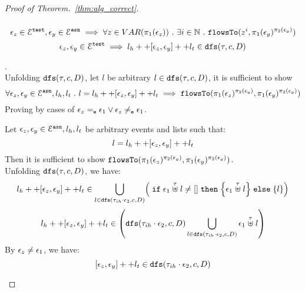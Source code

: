 \begin{proof}[Proof of Theorem.~\ref{thm:alg_correct}]
\begin{case}
\begin{equation}
\end{equation}
%
\begin{equation}
  \mathtt{\epsilon}_z \in \mathcal{E}^{\mathtt{{test}}}, \mathtt{\epsilon}_y \in \mathcal{E}^{\mathtt{{asn}}}
  \implies \forall z \in VAR(\pi_1(\mathtt{\epsilon}_z)) ~.~ \exists i \in\mathbb{N} ~.~
  \mathtt{flowsTo}(z^i, \pi_1(\mathtt{\epsilon}_y)^{\pi_2(\mathtt{\epsilon}_y)})
\end{equation}
%
\begin{equation}
  \mathtt{\epsilon}_z, \mathtt{\epsilon}_y \in \mathcal{E}^{\mathtt{{test}}}
  \implies l_h ++ [\mathtt{\epsilon}_z, \mathtt{\epsilon}_y] ++ l_t \in \mathtt{dfs}(\mathtt{\tau}, c, D)
\end{equation}
\begin{subcase}.
\\
Unfolding $\mathtt{dfs}(\mathtt{\tau}, c, D)$, let $l$ be arbitrary $l \in  \mathtt{dfs}(\mathtt{\tau}, c, D)$, it is sufficient to show 
\[
   \forall \mathtt{\epsilon}_z, \mathtt{\epsilon}_y \in \mathcal{E}^{\mathtt{{asn}}}, l_h, l_t ~.~ 
   l = l_h ++ [\mathtt{\epsilon}_z, \mathtt{\epsilon}_y] ++ l_t 
   \implies \mathtt{flowsTo}(\pi_1(\mathtt{\epsilon}_z)^{\pi_2(\mathtt{\epsilon}_y)}, \pi_1(\mathtt{\epsilon}_y)^{\pi_2(\mathtt{\epsilon}_y)})
\] 
%
Proving by cases of $\mathtt{\epsilon}_z =_{\mathtt{e}} \mathtt{\epsilon}_1 \lor \mathtt{\epsilon}_z \neq_{\mathtt{e}} \mathtt{\epsilon}_1$.
\begin{subsubcase}
Let $\mathtt{\epsilon}_z, \mathtt{\epsilon}_y \in \mathcal{E}^{\mathtt{{asn}}}, l_h, l_t$ be arbitrary events and lists such that:
\[
  l = l_h ++ [\mathtt{\epsilon}_z, \mathtt{\epsilon}_y] ++ l_t 
\]
%
Then it is sufficient to show $\mathtt{flowsTo}(\pi_1(\mathtt{\epsilon}_z)^{\pi_2(\mathtt{\epsilon}_y)}, \pi_1(\mathtt{\epsilon}_y)^{\pi_2(\mathtt{\epsilon}_y)})$.
\\
Unfolding $\mathtt{dfs}(\mathtt{\tau}, c, D)$, we have:
%
\[
  l_h ++ [\event_z, \event_y] ++ l_t  \in 
     \bigcup\limits_{l \in \kw{dfs}(\trace_{ih} \cdot \event_2, c, D) }
  \left(  \eif \event_1 \stackrel{\trace}{\uplus} l \neq [] 
  \ethen \left\{ \event_1 \stackrel{\trace}{\uplus} l \right\} \eelse \left\{ l \right\}
  \right)
\]
%
\[
  l_h ++ [\event_z, \event_y] ++ l_t  \in 
  \left(  \kw{dfs}(\trace_{ih} \cdot \event_2, c, D) \bigcup\limits_{l \in \kw{dfs}(\trace_{ih} \cdot \event_2, c, D) } \event_1 \stackrel{\trace}{\uplus} l 
  \right)
\]
%
By $\mathtt{\epsilon}_z \neq \mathtt{\epsilon}_1$, we have:
\[
  [\mathtt{\epsilon}_z, \mathtt{\epsilon}_y] ++ l_t \in \mathtt{dfs}(\mathtt{\tau}_{ih} \cdot \mathtt{\epsilon}_2, c, D)
\]
%

\end{subsubcase}
\end{subcase}
\end{case}
\end{proof}

